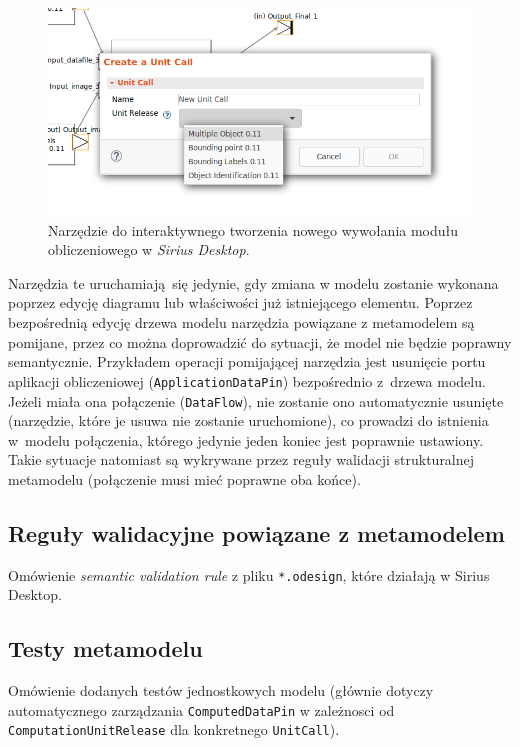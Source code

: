 \begin{figure}[!hb]
	\centering

	\includegraphics[width=0.95\linewidth]{./images/sirius-desktop-create-unit-call-tool.png}
	\caption{Narzędzie do interaktywnego tworzenia nowego wywołania modułu
		obliczeniowego w \emph{Sirius Desktop}.}\label{rys:sirius-desktop-create-unit-call-tool}
\end{figure}

Narzędzia te uruchamiają się jedynie, gdy zmiana w modelu zostanie wykonana
poprzez edycję diagramu lub właściwości już istniejącego elementu. Poprzez
bezpośrednią edycję drzewa modelu narzędzia powiązane z metamodelem są
pomijane, przez co można doprowadzić do sytuacji, że model nie będzie poprawny
semantycznie. Przykładem operacji pomijającej narzędzia jest usunięcie portu
aplikacji obliczeniowej (\texttt{ApplicationDataPin}) bezpośrednio z~drzewa
modelu. Jeżeli miała ona połączenie (\texttt{DataFlow}), nie zostanie ono
automatycznie usunięte (narzędzie, które je usuwa nie zostanie uruchomione), co
prowadzi do istnienia w~modelu połączenia, którego jedynie jeden koniec jest
poprawnie ustawiony. Takie sytuacje natomiast są wykrywane przez reguły
walidacji strukturalnej metamodelu (połączenie musi mieć poprawne oba końce).

\subsection{Reguły walidacyjne powiązane z
	metamodelem}\label{sec:regulky-walidacyjne-metamodel}

Omówienie \textit{semantic validation rule} z pliku \texttt{*.odesign}, które
działają w Sirius Desktop.

\subsection{Testy metamodelu}

Omówienie dodanych testów jednostkowych modelu (głównie dotyczy automatycznego
zarządzania \texttt{ComputedDataPin} w zależnosci od
\texttt{ComputationUnitRelease} dla konkretnego \texttt{UnitCall}).
